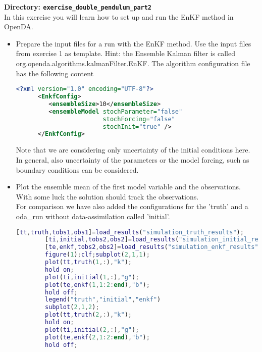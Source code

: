 {\bf Directory: {\tt exercise\_double\_pendulum\_part2}}\\

In this exercise you will learn how to set up and run the EnKF method in OpenDA.

\begin{itemize}
  \item Prepare the input files for a run with the EnKF method. Use the input
        files from exercise 1 as template. Hint: the Ensemble Kalman filter
        is called org.openda.algorithms.kalmanFilter.EnKF. The algorithm
        configuration file has the following content
      \begin{lstlisting}[language=XML,frame=single,caption={XML-input for EnKF algorithm}]
      <?xml version="1.0" encoding="UTF-8"?>
      <EnkfConfig>
         <ensembleSize>10</ensembleSize>
         <ensembleModel stochParameter="false"
                        stochForcing="false"
                        stochInit="true" />
      </EnkfConfig>
      \end{lstlisting}
      Note that we are considering only uncertainty of the initial conditions here. In general, also uncertainty of the 
      parameters or the model forcing, such as boundary conditions can be considered.

  \item Plot the ensemble mean of the first model variable and the observations.
        With some luck the solution should track the observations. \\
        For comparison we have also added the configurations for the 'truth' and a oda\_run
        without data-assimilation called 'initial'.
        
\ifshowmatlab
        \begin{lstlisting}[language=Matlab,frame=single,caption={Matlab}]
        [tt,truth,tobs1,obs1]=load_results("simulation_truth_results");
        [ti,initial,tobs2,obs2]=load_results("simulation_initial_results");
        [te,enkf,tobs2,obs2]=load_results("simulation_enkf_results");
        figure(1);clf;subplot(2,1,1);
        plot(tt,truth(1,:),"k");
        hold on;
        plot(ti,initial(1,:),"g");
        plot(te,enkf(1,1:2:end),"b");
        hold off;
        legend("truth","initial","enkf")
        subplot(2,1,2);
        plot(tt,truth(2,:),"k");
        hold on;
        plot(ti,initial(2,:),"g");
        plot(te,enkf(2,1:2:end),"b");
        hold off;
        \end{lstlisting}
\fi


\end{itemize}
